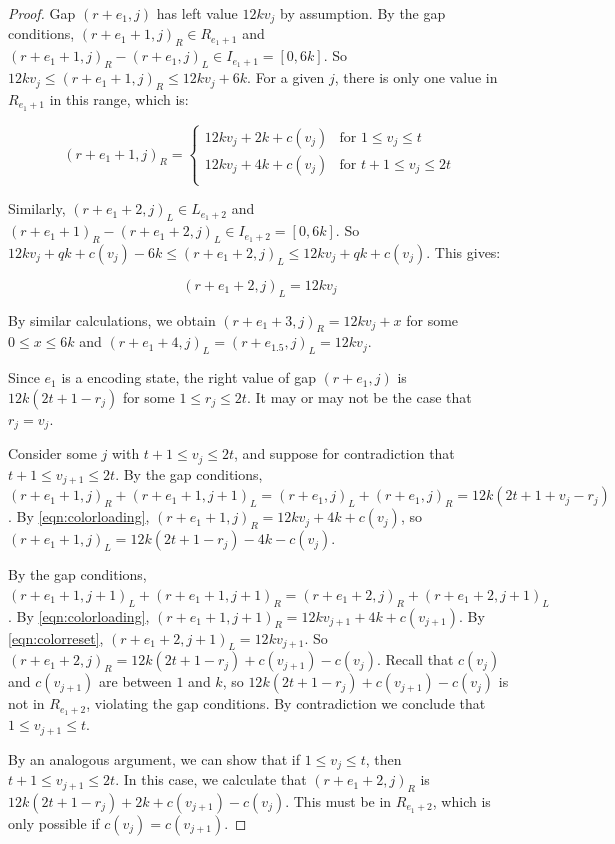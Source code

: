 \documentclass[11pt]{article}
\theoremstyle{plain}
\theoremstyle{definition}
\begin{document}
\begin{proof}
Gap $(r+e_1, j)$ has left value $12kv_j$ by assumption. By the gap conditions, $(r+e_1+1, j)_R\in R_{e_1+1}$ and $(r+e_1+1, j)_R-(r+e_1, j)_L\in I_{e_1+1}=[0, 6k]$. So $12kv_j\le (r+e_1+1, j)_R\le12kv_j+6k$. For a given $j$, there is only one value in $R_{e_1+1}$ in this range, which is:

\begin{equation}\label{eqn:colorloading}
(r+e_1+1, j)_R=\begin{cases}
    12kv_j+2k+c(v_j)&\text{for } 1\le v_j\le t\\
    12kv_j+4k+c(v_j)&\text{for } t+1\le v_j\le 2t\\
\end{cases}
\end{equation}

Similarly, $(r+e_1+2, j)_L\in L_{e_1+2}$ and $(r+e_1+1)_R-(r+e_1+2, j)_L\in I_{e_1+2}=[0, 6k]$. So $12kv_j+qk+c(v_j)-6k\le (r+e_1+2, j)_L\le 12kv_j+qk+c(v_j)$. This gives:

\begin{equation}\label{eqn:colorreset}
(r+e_1+2, j)_L=12kv_j
\end{equation}

By similar calculations, we obtain $(r+e_1+3, j)_R=12kv_j+x$ for some $0\le x\le 6k$ and $(r+e_1+4, j)_L=(r+e_{1.5}, j)_L=12kv_j$. 

Since $e_1$ is a encoding state, the right value of gap $(r+e_1, j)$ is $12k(2t+1-r_j)$ for some $1\le r_j\le 2t$. It may or may not be the case that $r_j=v_j$. 

Consider some $j$ with $t+1\le v_j\le 2t$, and suppose for contradiction that $t+1\le v_{j+1}\le 2t$. By the gap conditions, $(r+e_1+1, j)_R+(r+e_1+1, j+1)_L=(r+e_1, j)_L+(r+e_1, j)_R=12k(2t+1+v_j-r_j)$. By \eqref{eqn:colorloading}, $(r+e_1+1, j)_R=12kv_j+4k+c(v_j)$, so $(r+e_1+1, j)_L=12k(2t+1-r_j)-4k-c(v_j)$. 

By the gap conditions, $(r+e_1+1, j+1)_L+(r+e_1+1, j+1)_R=(r+e_1+2, j)_R+(r+e_1+2, j+1)_L$. By \eqref{eqn:colorloading}, $(r+e_1+1, j+1)_R=12kv_{j+1}+4k+c(v_{j+1})$. By \eqref{eqn:colorreset}, $(r+e_1+2, j+1)_L=12kv_{j+1}$. So $(r+e_1+2, j)_R=12k(2t+1-r_j)+c(v_{j+1})-c(v_j)$. Recall that $c(v_j)$ and $c(v_{j+1})$ are between $1$ and $k$, so $12k(2t+1-r_j)+c(v_{j+1})-c(v_j)$ is not in $R_{e_1+2}$, violating the gap conditions. By contradiction we conclude that $1\le v_{j+1}\le t$.

By an analogous argument, we can show that if $1\le v_j\le t$, then $t+1\le v_{j+1}\le 2t$. In this case, we calculate that $(r+e_1+2, j)_R$ is $12k(2t+1-r_j)+2k+c(v_{j+1})-c(v_j)$. This must be in $R_{e_1+2}$, which is only possible if $c(v_j)=c(v_{j+1})$.
\end{proof}
\end{document}
